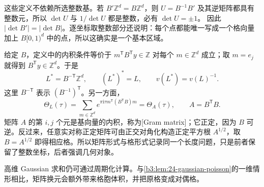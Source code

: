 这些定义不依赖所选整数基。若 \(B'\mathbb Z^d=B\mathbb Z^d\)，则
\(U=B^{-1}B'\) 及其逆矩阵都具有整数元，所以
\(\det U\) 与 \(1/\det U\) 都是整数，必有 \(\det U=\pm1\)。
因此 \(|\det B'|=|\det B|\)。逐坐标取整数部分还说明：每个点都能唯一写成一个格向量加上 \(B[0,1)^d\) 中的点，所以这确实是一个基本区域。

\ProseParagraphBreak

给定 \(B\)，定义中的内积条件等价于
\(m^{\mathsf T}B^{\mathsf T}y\in\mathbb Z\) 对每个 \(m\in\mathbb Z^d\) 成立；取 \(m=e_j\) 就得到 \(B^{\mathsf T}y\in\mathbb Z^d\)。于是
\begin{equation}\label{b3:eq:24-dual-lattice}
 L^*=B^{-\mathsf T}\mathbb Z^d,\qquad
 (L^*)^*=L,\qquad v(L^*)=v(L)^{-1}.
\end{equation}
这里 \(B^{-\mathsf T}\) 表示 \((B^{-1})^{\mathsf T}\)。另一方面，
\[
 \Theta_L(\tau)=\sum_{m\in\mathbb Z^d}
 e^{\pi\mathrm{i}\tau m^{\mathsf T}(B^{\mathsf T}B)m}
 =\Theta_A(\tau),\qquad A=B^{\mathsf T}B.
\]
矩阵 \(A\) 的第 \(i,j\) 个元是基向量的内积，称为[Gram matrix]；它正定，因为 \(B\) 可逆。反过来，任意实对称正定矩阵可由正交对角化构造正定平方根 \(A^{1/2}\)，取 \(B=A^{1/2}\) 即得相应格。所以矩阵形式与格形式记录同一个长度问题，只是前者保留了整数坐标，后者强调几何对象。

\ProseParagraphBreak

高维 Gaussian 求和仍可通过周期化计算。与\cref{b3:lem:24-gaussian-poisson}的一维情形相比，矩阵换元会额外带来格胞体积，并把原格变成对偶格。


